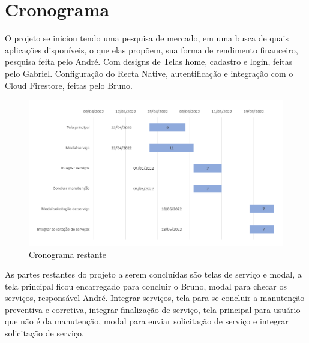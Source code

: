 \documentclass[%
  a4paper,%
  12pt,%
  english,%
  brazilian,%
]{article}
\begin{document}

\section{Cronograma}%

O projeto se iniciou tendo uma pesquisa de mercado, em uma busca de quais aplicações disponíveis, o que elas propõem, sua forma de rendimento financeiro, pesquisa feita pelo André. Com designs de Telas home, cadastro e login, feitas pelo Gabriel. Configuração do Recta Native, autentificação e integração com o Cloud Firestore, feitas pelo Bruno.
 

\begin{figure}[H]
  \includegraphics[width = 0.95\linewidth]{Figures/graf.png}
  \caption{Cronograma restante}
  \end{figure}


As partes restantes do projeto a serem concluídas são telas de serviço e modal, a tela principal ficou encarregado para concluir o Bruno, modal para checar os serviços, responsável André. Integrar serviços, tela para se concluir a manutenção preventiva e corretiva, integrar finalização de serviço, tela principal para usuário que não é da manutenção, modal para enviar solicitação de serviço e integrar solicitação de serviço.
\end{document}
